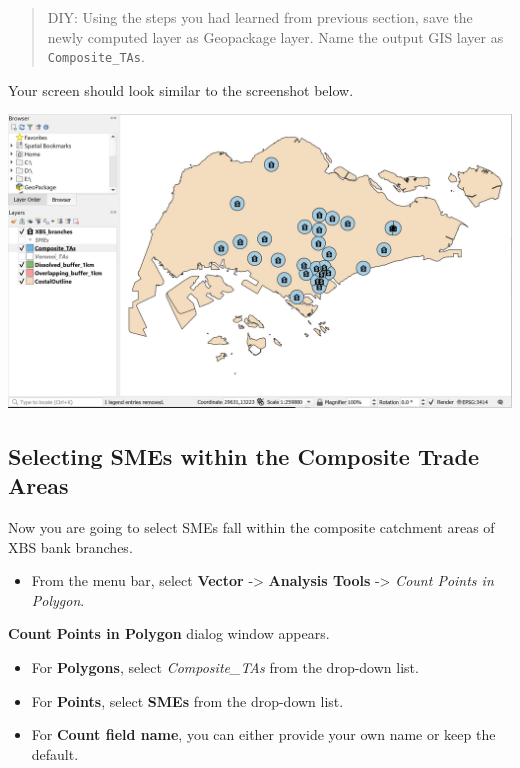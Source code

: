 \documentclass[
  letterpaper,
  DIV=11,
  numbers=noendperiod]{scrreprt}
\providecommand{\tightlist}{%
  \setlength{\itemsep}{0pt}\setlength{\parskip}{0pt}}\usepackage{longtable,booktabs,array}
\begin{document}
\begin{quote}
DIY: Using the steps you had learned from previous section, save the
newly computed layer as Geopackage layer. Name the output GIS layer as
\texttt{Composite\_TAs}.
\end{quote}

Your screen should look similar to the screenshot below.

\includegraphics{./img05/image25.jpg}

\hypertarget{selecting-smes-within-the-composite-trade-areas}{%
\subsection{Selecting SMEs within the Composite Trade
Areas}\label{selecting-smes-within-the-composite-trade-areas}}

Now you are going to select SMEs fall within the composite catchment
areas of XBS bank branches.

\begin{itemize}
\tightlist
\item
  From the menu bar, select \textbf{Vector} -\textgreater{}
  \textbf{Analysis Tools} -\textgreater{} \emph{Count Points in
  Polygon}.
\end{itemize}

\textbf{Count Points in Polygon} dialog window appears.

\begin{itemize}
\tightlist
\item
  For \textbf{Polygons}, select \emph{Composite\_TAs} from the drop-down
  list.
\item
  For \textbf{Points}, select \textbf{SMEs} from the drop-down list.
\item
  For \textbf{Count field name}, you can either provide your own name or
  keep the default.
\end{itemize}
\end{document}

